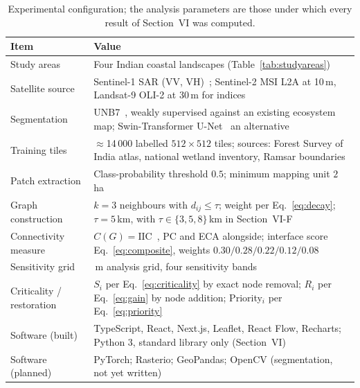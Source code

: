 \documentclass[conference]{IEEEtran}
\begin{document}
\begin{table}[!tbp]
\centering
\caption{Experimental configuration; the analysis parameters are those under which every result of Section~VI was computed.}
\label{tab:expsetup}
\tiny
\renewcommand{\arraystretch}{0.95}
\begin{tabularx}{\columnwidth}{@{}p{1.75cm}>{\raggedright\arraybackslash}X@{}}
\toprule
\textbf{Item} & \textbf{Value} \\
\midrule
Study areas & Four Indian coastal landscapes (Table~\ref{tab:studyareas}) \\
Satellite source & Sentinel-1 SAR (VV, VH)~\cite{ghorbanian2025mangrove}; Sentinel-2 MSI L2A at 10\,m, Landsat-9 OLI-2 at 30\,m for indices \\
Segmentation & UNB7~\cite{ghorbanian2025mangrove}, weakly supervised against an existing ecosystem map; Swin-Transformer U-Net~\cite{liu2021swin} an alternative \\
Training tiles & $\approx$14\,000 labelled $512 \times 512$ tiles; sources: Forest Survey of India atlas, national wetland inventory, Ramsar boundaries \\
Patch extraction & Class-probability threshold $0.5$; minimum mapping unit $2$\,ha \\
Graph construction & $k = 3$ neighbours with $d_{ij} \leq \tau$; weight per Eq.~\eqref{eq:decay}; $\tau = 5$\,km, with $\tau \in \{3,5,8\}$\,km in Section~VI-F \\
Connectivity measure & $C(G) = \mathrm{IIC}$~\cite{pascualhortal2006comparison}, PC and ECA alongside; interface score Eq.~\eqref{eq:composite}, weights $0.30/0.28/0.22/0.12/0.08$ \\
Sensitivity grid & 100\,m analysis grid, four sensitivity bands \\
Criticality / restoration & $S_i$ per Eq.~\eqref{eq:criticality} by exact node removal; $R_i$ per Eq.~\eqref{eq:gain} by node addition; Priority$_i$ per Eq.~\eqref{eq:priority} \\
Software (built) & TypeScript, React, Next.js, Leaflet, React Flow, Recharts; Python 3, standard library only (Section~VI) \\
Software (planned) & PyTorch; Rasterio; GeoPandas; OpenCV (segmentation, not yet written) \\
\bottomrule
\end{tabularx}
\end{table}

\end{document}
